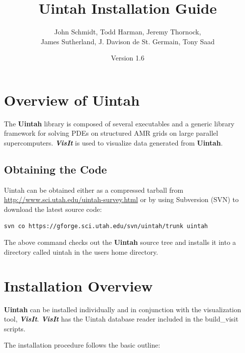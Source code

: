 \documentclass[12pt]{article}
\begin{document}
\title{Uintah Installation Guide}

\author{John Schmidt, Todd Harman, Jeremy Thornock, \\
  James Sutherland, J. Davison de St. Germain, Tony Saad}

\date{Version 1.6}

\maketitle



\newpage

\tableofcontents

\newpage

\section{Overview of Uintah} \label{sec:overview} The \textbf{Uintah}
library is composed of several executables and a generic library
framework for solving PDEs on structured AMR grids on large parallel
supercomputers. \textbf{\emph{VisIt}} is used to visualize data
generated from \textbf{Uintah}.

\subsection{Obtaining the Code}
Uintah can be obtained either as a compressed tarball from
\url{http://www.sci.utah.edu/uintah-survey.html} or by
using Subversion (SVN) to download the latest source code:

\begin{verbatim}
svn co https://gforge.sci.utah.edu/svn/uintah/trunk uintah
\end{verbatim}

The above command checks out the \textbf{Uintah} source tree and
installs it into a directory called uintah in the users home
directory.


\section{Installation Overview}

\textbf{Uintah} can be installed individually and in conjunction with
the visualization tool, \textbf{\emph{VisIt}}.  \textbf{\emph{VisIt}}
has the Uintah database reader included in the build\_visit scripts.

The installation procedure follows the basic outline:
\end{document}
